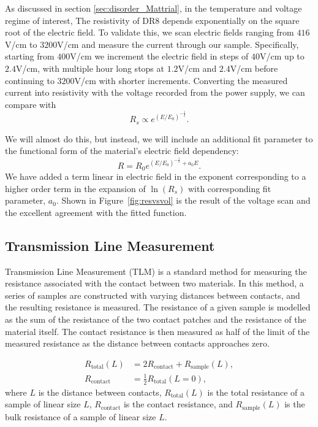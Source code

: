 \documentclass[a4paper,12pt]{article}
\begin{document}
As discussed in section \ref{sec:disorder_Mattrial}, in the temperature and voltage regime of interest, The resistivity of DR8 depends exponentially on the  square root of the electric field. To validate this, we scan electric fields ranging from $416$V/cm to $3200$V/cm and measure the current through our sample. Specifically, starting from $400$V/cm we increment the electric field in steps of $40$V/cm up to $2.4$V/cm, with multiple hour long stops at $1.2$V/cm and $2.4$V/cm before continuing to $3200$V/cm with shorter increments.
Converting the measured current into resistivity with the voltage recorded from the power supply, we can compare with 
\begin{equation}
R_s \propto  e^{( E / E_0)^{-\frac{1}{2}}}.
\end{equation}

We will almost do this, but instead, we will include an additional fit parameter to the functional form of the material's electric field dependency:
\begin{equation}
R=R_0 e^{( E / E_0)^{-\frac{1}{2}}+a_0 E}.
\end{equation}
We have added a term linear in electric field in the exponent corresponding to a higher order term in the expansion of $\ln(R_s)$ with corresponding fit parameter, $a_0$. Shown in Figure~\ref{fig:resvsvol} is the result of the voltage scan and the excellent agreement with the fitted function. 


\subsection{Transmission Line Measurement}
\label{sec:transLine}

Transmission Line Measurement (TLM) is a standard method for measuring the resistance associated with the contact between two materials.  In this method, a series of samples are constructed with varying distances between contacts, and the resulting resistance is measured.  The resistance of a given sample is modelled as the sum of the resistance of the two contact patches and the resistance of the material itself.  The contact resistance is then measured as half of the limit of the measured resistance as the distance between contacts approaches zero.

\begin{equation} \label{eq:TLM}
\begin{split} 
	R_{\mathrm{total}}(L) &= 2 R_{\mathrm{contact}} + R_{\mathrm{sample}}(L), \\
	R_{\mathrm{contact}}  &= \tfrac{1}{2} R_{\mathrm{total}}(L = 0),
\end{split}
\end{equation}
where $L$ is the distance between contacts, $R_{\mathrm{total}}(L)$ is the total resistance of a sample of linear size $L$, $R_\mathrm{contact}$ is the contact resistance, and $R_{\mathrm{sample}}(L)$ is the bulk resistance of a sample of linear size $L$.
\end{document}
